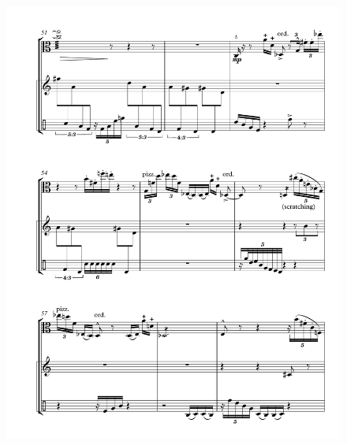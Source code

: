 \begin{figure}[htbp]
    \centering
	\includegraphics[width=6.5in]{figures/Viola_Percussion_8.pdf}
\end{figure}

